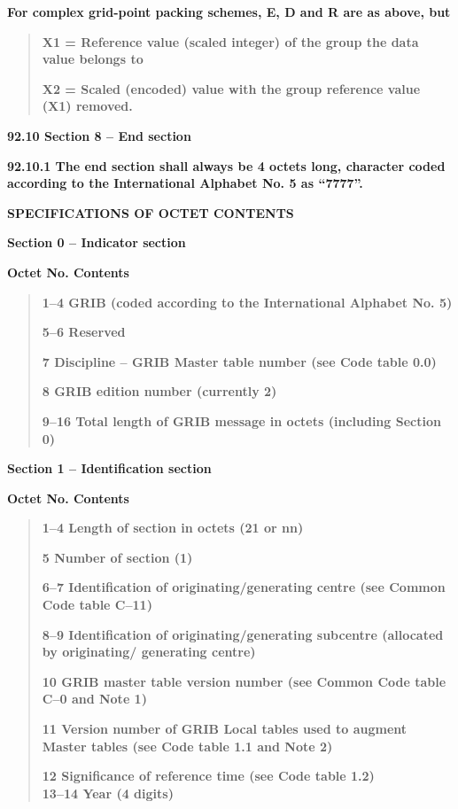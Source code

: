 \textbf{For complex grid-point packing schemes, E, D and R are as above, but}

\begin{quote}
\textbf{X1 = Reference value (scaled integer) of the group the data value belongs to}

\textbf{X2 = Scaled (encoded) value with the group reference value (X1) removed.}
\end{quote}

\textbf{92.10 Section 8 -- End section}

\textbf{92.10.1 The end section shall always be 4 octets long, character coded according to the International Alphabet No. 5 as ``7777''.}

\textbf{SPECIFICATIONS OF OCTET CONTENTS}

\textbf{Section 0 -- Indicator section\\
}

\textbf{Octet No. Contents}

\begin{quote}
\textbf{1--4 GRIB (coded according to the International Alphabet No. 5)}

\textbf{5--6 Reserved}

\textbf{7 Discipline -- GRIB Master table number (see Code table 0.0)}

\textbf{8 GRIB edition number (currently 2)}

\textbf{9--16 Total length of GRIB message in octets (including Section 0)}
\end{quote}

\textbf{Section 1 -- Identification section\\
}

\textbf{Octet No. Contents}

\begin{quote}
\textbf{1--4 Length of section in octets (21 or nn)}

\textbf{5 Number of section (1)}

\textbf{6--7 Identification of originating/generating centre (see Common Code table C--11)}

\textbf{8--9 Identification of originating/generating subcentre (allocated by originating/ generating centre)}

\textbf{10 GRIB master table version number (see Common Code table C--0 and Note 1)}

\textbf{11 Version number of GRIB Local tables used to augment Master tables (see Code table 1.1 and Note 2)}

\textbf{12 Significance of reference time (see Code table 1.2)\\
13--14 Year (4 digits)}
\end{quote}

